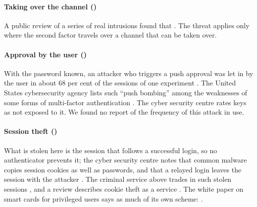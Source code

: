 \paragraph{Taking over the channel ()}
A public review of a series of real intrusions found that
.
The threat applies only where the second factor travels over a channel
that can be taken over.

\paragraph{Approval by the user ()}
With the password known, an attacker who triggers a push approval was
let in by the user in about 68 per cent of the sessions of one
experiment \autocite[\abso]{Jubur2021PushBypass}.
The United States cybersecurity agency lists such
\enquote{push bombing} among the weaknesses of some forms of
multi-factor authentication \autocite{CISA2022PhishingResistant}.
The cyber security centre rates keys as not exposed to it.
We found no report of the frequency of this attack in use.

\paragraph{Session theft ()}
What is stolen here is the session that follows a successful login, so
no authenticator prevents it; the cyber security centre notes that
common malware copies session cookies as well as passwords, and that a
relayed login leaves the session with the attacker
\autocite{NCSC2026CredentialsPaper}.
The criminal service above trades in such stolen sessions
\autocite{Campobasso2020IMPaaS}, and a review describes cookie theft as
a service \autocite[\abso]{Pazmino2025Cookie}.
The white paper on smart cards for privileged users says as much of its
own scheme:
.

